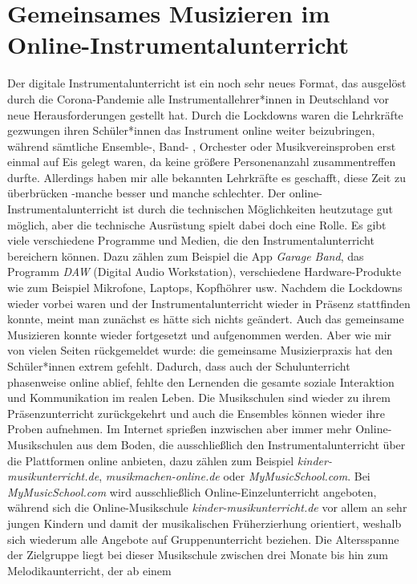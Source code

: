 \section{Gemeinsames Musizieren im Online-Instrumentalunterricht}

Der digitale Instrumentalunterricht ist ein noch sehr neues Format, das
ausgelöst durch die Corona-Pandemie alle Instrumentallehrer*innen in Deutschland
vor neue Herausforderungen gestellt hat. Durch die Lockdowns waren die
Lehrkräfte gezwungen ihren Schüler*innen das Instrument online weiter
beizubringen, während sämtliche Ensemble-, Band- , Orchester oder
Musikvereinsproben erst einmal auf Eis gelegt waren, da keine größere
Personenanzahl zusammentreffen durfte. Allerdings haben mir alle bekannten
Lehrkräfte es geschafft, diese Zeit zu überbrücken -manche besser und manche
schlechter. Der online-Instrumentalunterricht ist durch die technischen
Möglichkeiten heutzutage gut möglich, aber die technische Ausrüstung spielt
dabei doch eine Rolle. Es gibt viele verschiedene Programme und Medien, die den
Instrumentalunterricht bereichern können. Dazu zählen zum Beispiel die App
\emph{Garage Band}, das Programm \emph{DAW} (Digital Audio Workstation),
verschiedene Hardware-Produkte wie zum Beispiel Mikrofone, Laptops, Kopfhöhrer
usw. Nachdem die Lockdowns wieder vorbei waren und der Instrumentalunterricht
wieder in Präsenz stattfinden konnte, meint man zunächst es hätte sich nichts
geändert. Auch das gemeinsame Musizieren konnte wieder fortgesetzt und
aufgenommen werden. Aber wie mir von vielen Seiten rückgemeldet wurde: die
gemeinsame Musizierpraxis hat den Schüler*innen extrem gefehlt. Dadurch, dass
auch der Schulunterricht phasenweise online ablief, fehlte den Lernenden die
gesamte soziale Interaktion und Kommunikation im realen Leben. Die Musikschulen
sind wieder zu ihrem Präsenzunterricht zurückgekehrt und auch die Ensembles
können wieder ihre Proben aufnehmen. Im Internet sprießen inzwischen aber immer
mehr Online-Musikschulen aus dem Boden, die ausschließlich den
Instrumentalunterricht über die Plattformen online anbieten, dazu zählen zum
Beispiel \emph{kinder-musikunterricht.de}, \emph{musikmachen-online.de} oder
\emph{MyMusicSchool.com}. Bei \emph{MyMusicSchool.com} wird ausschließlich
Online-Einzelunterricht angeboten, während sich die Online-Musikschule
\emph{kinder-musikunterricht.de} vor allem an sehr jungen Kindern und damit der
musikalischen Früherzierhung orientiert, weshalb sich wiederum alle Angebote auf
Gruppenunterricht beziehen. Die Altersspanne der Zielgruppe liegt bei dieser
Musikschule zwischen drei Monate bis hin zum Melodikaunterricht, der ab einem
